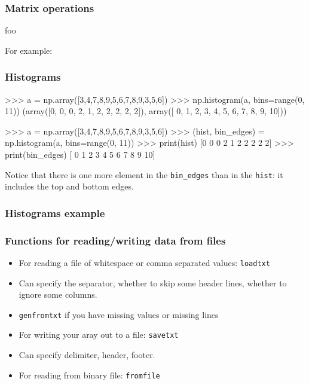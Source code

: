 \documentclass{beamer}
\begin{document}
\begin{frame}[fragile]
\frametitle{Matrix operations}

foo
\end{frame}

For example: 


\begin{frame}[fragile]
\frametitle{Histograms}
\begin{code}
>>> a = np.array([3,4,7,8,9,5,6,7,8,9,3,5,6])
>>> np.histogram(a, bins=range(0, 11))
(array([0, 0, 0, 2, 1, 2, 2, 2, 2, 2]), array([ 0,  1,  2,  3,  4,  5,  6,  7,  8,  9, 10]))

>>> a = np.array([3,4,7,8,9,5,6,7,8,9,3,5,6])
>>> (hist, bin_edges) = np.histogram(a, bins=range(0, 11))
>>> print(hist)
[0 0 0 2 1 2 2 2 2 2]
>>> print(bin_edges)
[ 0  1  2  3  4  5  6  7  8  9 10]
\end{code}

Notice that there is one more element in the \texttt{bin\_edges} than in the \texttt{hist}: it includes the top and bottom edges.
\end{frame}

\begin{frame}[fragile]
\frametitle{Histograms example}

\end{frame}

\begin{frame}[fragile]
\frametitle{Functions for reading/writing data from files}
\begin{itemize}
\item For reading a file of whitespace or comma separated values: \texttt{loadtxt}
\item Can specify the separator, whether to skip some header lines,
  whether to ignore some columns.
\item \texttt{genfromtxt} if you have missing values or missing lines
\item For writing your aray out to a file: \texttt{savetxt}
\item Can specify delimiter, header, footer.
\item For reading from binary file: \texttt{fromfile}
\end{itemize}
\end{frame}
\end{document}
